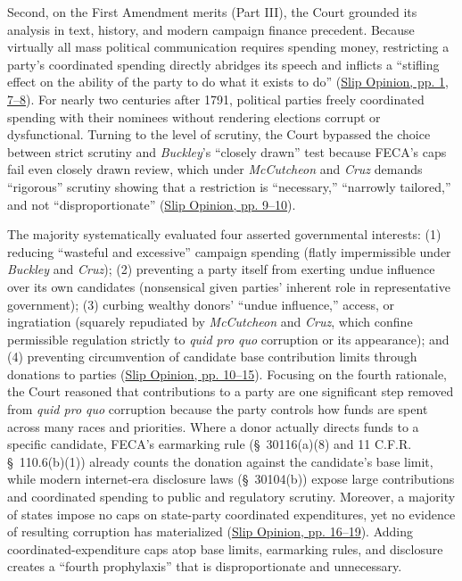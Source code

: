 \documentclass[12pt]{article}
\begin{document}
Second, on the First Amendment merits (Part III), the Court grounded its analysis in text, history, and modern campaign finance precedent. Because virtually all mass political communication requires spending money, restricting a party's coordinated spending directly abridges its speech and inflicts a ``stifling effect on the ability of the party to do what it exists to do'' (\href{https://www.supremecourt.gov/opinions/25pdf/24-621_h315.pdf}{Slip Opinion, pp. 1, 7--8}). For nearly two centuries after 1791, political parties freely coordinated spending with their nominees without rendering elections corrupt or dysfunctional. Turning to the level of scrutiny, the Court bypassed the choice between strict scrutiny and \textit{Buckley}'s ``closely drawn'' test because FECA's caps fail even closely drawn review, which under \textit{McCutcheon} and \textit{Cruz} demands ``rigorous'' scrutiny showing that a restriction is ``necessary,'' ``narrowly tailored,'' and not ``disproportionate'' (\href{https://www.supremecourt.gov/opinions/25pdf/24-621_h315.pdf}{Slip Opinion, pp. 9--10}).

The majority systematically evaluated four asserted governmental interests: (1) reducing ``wasteful and excessive'' campaign spending (flatly impermissible under \textit{Buckley} and \textit{Cruz}); (2) preventing a party itself from exerting undue influence over its own candidates (nonsensical given parties' inherent role in representative government); (3) curbing wealthy donors' ``undue influence,'' access, or ingratiation (squarely repudiated by \textit{McCutcheon} and \textit{Cruz}, which confine permissible regulation strictly to \textit{quid pro quo} corruption or its appearance); and (4) preventing circumvention of candidate base contribution limits through donations to parties (\href{https://www.supremecourt.gov/opinions/25pdf/24-621_h315.pdf}{Slip Opinion, pp. 10--15}). Focusing on the fourth rationale, the Court reasoned that contributions to a party are one significant step removed from \textit{quid pro quo} corruption because the party controls how funds are spent across many races and priorities. Where a donor actually directs funds to a specific candidate, FECA's earmarking rule (\S~30116(a)(8) and 11 C.F.R. \S~110.6(b)(1)) already counts the donation against the candidate's base limit, while modern internet-era disclosure laws (\S~30104(b)) expose large contributions and coordinated spending to public and regulatory scrutiny. Moreover, a majority of states impose no caps on state-party coordinated expenditures, yet no evidence of resulting corruption has materialized (\href{https://www.supremecourt.gov/opinions/25pdf/24-621_h315.pdf}{Slip Opinion, pp. 16--19}). Adding coordinated-expenditure caps atop base limits, earmarking rules, and disclosure creates a ``fourth prophylaxis'' that is disproportionate and unnecessary.
\end{document}
